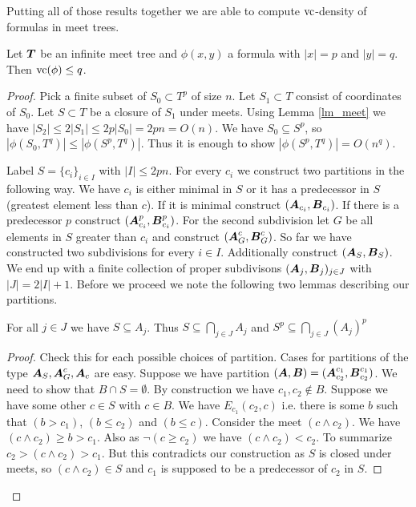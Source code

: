 \documentclass{amsart}
\DeclareMathOperator{\TT}{\boldface T}
\DeclareMathOperator{\A}{\boldface A}
\DeclareMathOperator{\B}{\boldface B}
\begin{document}
Putting all of those results together we are able to compute $\operatorname{vc}$-density of formulas in meet trees.

\begin{Theorem}
	Let $\TT$ be an infinite meet tree and $\phi(x, y)$ a formula with $|x| = p$ and $|y| = q$. Then $\operatorname{vc}(\phi) \leq q$.
\end{Theorem}

\begin{proof}
	Pick a finite subset of $S_0 \subset T^p$ of size $n$. Let $S_1 \subset T$ consist of coordinates of $S_0$. Let $S \subset T$ be a closure of $S_1$ under meets. Using Lemma \ref{lm_meet} we have $|S_2| \leq 2|S_1| \leq 2p|S_0| = 2pn = O(n)$. We have $S_0 \subseteq S^p$, so $|\phi(S_0, T^q)| \leq |\phi(S^p, T^q)|$. Thus it is enough to show $|\phi(S^p, T^q)| = O(n^q)$.
	
	Label $S = \{c_i\}_{i \in I}$ with $|I| \leq 2pn$. For every $c_i$ we construct two partitions in the following way. We have $c_i$ is either minimal in $S$ or it has a predecessor in $S$ (greatest element less than $c$). If it is minimal construct $(\A_{c_i}, \B_{c_i})$. If there is a predecessor $p$ construct $(\A^p_{c_i}, \B^p_{c_i})$. For the second subdivision let $G$ be all elements in $S$ greater than $c_i$ and construct $(\A^c_G, \B^c_G)$. So far we have constructed two subdivisions for every $i \in I$. Additionally construct $(\A_S, \B_S)$. We end up with a finite collection of proper subdivisons $(\A_j, \B_j)_{j \in J}$ with $|J| = 2|I| + 1$. Before we proceed we note the following two lemmas describing our partitions.
	
	\begin{Lemma}
		For all $j \in J$ we have $S \subseteq A_j$. Thus $S \subseteq \bigcap_{j \in J} A_j$ and $S^p \subseteq \bigcap_{j \in J} (A_j)^p$ 
	\end{Lemma}
	
	\begin{proof}
		Check this for each possible choices of partition. Cases for partitions of the type $\A_S, \A^c_G, \A_c$ are easy. Suppose we have partition $(\A, \B) = (\A^{c_1}_{c_2}, \B^{c_1}_{c_2})$. We need to show that $B \cap S = \emptyset$. By construction we have $c_1, c_2 \notin B$. Suppose we have some other $c \in S$ with $c \in B$. We have $E_{c_1}(c_2, c)$ i.e. there is some $b$ such that $(b > c_1)$, $(b \leq c_2)$ and $(b \leq c)$. Consider the meet $(c \wedge c_2)$. We have $(c \wedge c_2) \geq b > c_1$. Also as $\neg (c \geq c_2)$ we have $(c \wedge c_2) < c_2$. To summarize $c_2 > (c \wedge c_2) > c_1$. But this contradicts our construction as $S$ is closed under meets, so $(c \wedge c_2) \in S$ and $c_1$ is supposed to be a predecessor of $c_2$ in $S$.
	\end{proof}
	

\end{proof}
\end{document}
